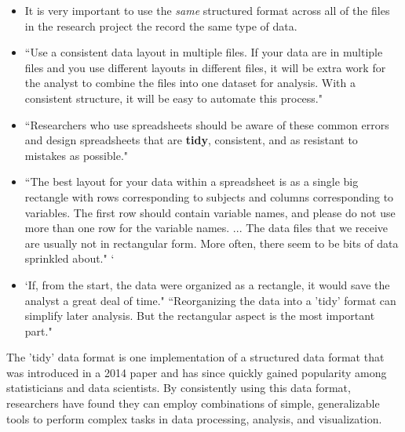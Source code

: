 \documentclass[pdftex,english,11pt,parskip=half]{scrartcl}
\begin{document}
\begin{itemize}
\item It is very important to use the \textit{same} structured format across all of the files in the research project the record the same type of data. 
\item ``Use a consistent data layout in multiple files. If your data are in multiple files and you use different layouts in different files, it will be extra work for the analyst to combine the files into one dataset for analysis. With a consistent structure, it will be easy to automate this process." \cite{broman2018data}
\item ``Researchers who use spreadsheets should be aware of these common errors and design spreadsheets that are \textbf{tidy}, consistent, and as resistant to mistakes as possible." \cite{broman2018data} 
\item ``The best layout for your data within a spreadsheet is as a single big rectangle with rows corresponding to subjects and columns corresponding to variables. The first row should contain variable names, and please do not use more than one row for the variable names. ... The data files that we receive are usually not in rectangular form. More often, there seem to be bits of data sprinkled about." \cite{broman2018data} `
\item `If, from the start, the data were organized as a rectangle, it would save the analyst a great deal of time." \cite{broman2018data} ``Reorganizing the data into a 'tidy' format can simplify later analysis. But the rectangular aspect is the most important part." \cite{broman2018data}
\end{itemize}

The 'tidy' data format is one implementation of a structured data format that was introduced in a 2014 paper and has since quickly gained popularity among statisticians and data scientists. By consistently using this data format, researchers have found they can employ combinations of simple, generalizable tools to perform complex tasks in data processing, analysis, and visualization. 
\end{document}
